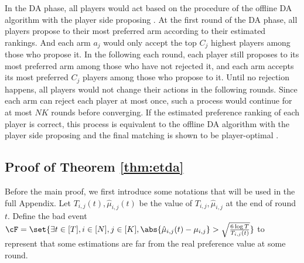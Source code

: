 In the DA phase, all players would act based on the procedure of the offline DA algorithm with the player side proposing \cite{roth1984stability,roth1992two}. At the first round of the DA phase, all players propose to their most preferred arm according to their estimated rankings. And each arm $a_j$ would only accept the top $C_j$ highest players among those who propose it. 
In the following each round, each player still proposes to its most preferred arm among those who have not rejected it, and each arm accepts its most preferred $C_j$ players among those who propose to it.  
Until no rejection happens, all players would not change their actions in the following rounds. 
Since each arm can reject each player at most once, such a process would continue for at most $NK$ rounds before converging. If the estimated preference ranking of each player is correct, this process is equivalent to the offline DA algorithm with the player side proposing and the final matching is shown to be player-optimal \citep{roth1984stability,roth1992two}.












\subsection{Proof of Theorem \ref{thm:etda}}\label{sec:proof:etda}

Before the main proof, we first introduce some notations that will be used in the full Appendix. 
Let $T_{i,j}(t),\hat{\mu}_{i,j}(t)$ be the value of $T_{i,j},\hat{\mu}_{i,j}$ at the end of round $t$. Define the bad event 
$\cF = \set{\exists t\in[T], i\in[N],j\in[K], \abs{\hat{\mu}_{i,j}(t)-\mu_{i,j}} > \sqrt{\frac{6\log T}{ T_{i,j}(t)}} }$
to represent that some estimations are far from the real preference value at some round. 






